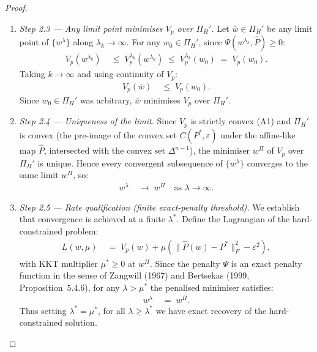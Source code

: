 \documentclass[12pt,openany]{book}
\newcommand{\bfw}{\mathbf{w}}
\newcommand{\calC}{\mathcal{C}}
\numberwithin{equation}{chapter}
\theoremstyle{plain}
\theoremstyle{definition}
\theoremstyle{remark}
\def\mathcal#1{#1}%
\def\calC{C}%
\def\bfw{w}%
\begin{document}
\begin{proof}
\begin{enumerate}
  \item \emph{Step 2.3 — Any limit point minimises $V_p$ over
        $\Pi_H'$.}
        Let $\bar\bfw \in \Pi_H'$ be any limit point of
        $\{\bfw^\lambda\}$ along $\lambda_k \to \infty$.
        For any $\bfw_0 \in \Pi_H'$, since
        $\Psi(\bfw^{\lambda_k},\hat{P}) \geq 0$:
        \begin{align}
          V_p(\bfw^{\lambda_k})
          &\;\leq\; V_p^{\lambda_k}(\bfw^{\lambda_k})
          \;\leq\; V_p^{\lambda_k}(\bfw_0)
          \;=\; V_p(\bfw_0).
          \label{eq:vp-ub-chain}
        \end{align}
        Taking $k \to \infty$ and using continuity of $V_p$:
        \begin{align}
          V_p(\bar\bfw) &\;\leq\; V_p(\bfw_0).
          \label{eq:vp-bar-opt}
        \end{align}
        Since $\bfw_0 \in \Pi_H'$ was arbitrary,
        $\bar\bfw$ minimises $V_p$ over $\Pi_H'$.

  \item \emph{Step 2.4 — Uniqueness of the limit.}
        Since $V_p$ is strictly convex (A1) and $\Pi_H'$ is convex
        (the pre-image of the convex set $\calC(P^*,\varepsilon)$
        under the affine-like map $\hat{P}$, intersected with the
        convex set $\Delta^{n-1}$), the minimiser $\bfw^{\Pi}$ of
        $V_p$ over $\Pi_H'$ is unique.  Hence every convergent
        subsequence of $\{\bfw^\lambda\}$ converges to the same
        limit $\bfw^{\Pi}$, so:
        \begin{align}
          \bfw^\lambda &\;\to\; \bfw^{\Pi}
          \quad \text{as } \lambda \to \infty.
          \label{eq:convergence}
        \end{align}

  \item \emph{Step 2.5 — Rate qualification (finite exact-penalty
        threshold).}
        We establish that convergence is achieved at a finite
        $\lambda^*$.  Define the Lagrangian of the hard-constrained
        problem:
        \begin{align}
          \mathcal{L}(\bfw, \mu)
          &\;=\; V_p(\bfw)
            + \mu\!\left(
              \|\hat{P}(\bfw) - P^*\|_F^2 - \varepsilon^2
            \right),
          \label{eq:lagrangian-soft}
        \end{align}
        with KKT multiplier $\mu^* \geq 0$ at $\bfw^{\Pi}$.  Since
        the penalty $\Psi$ is an exact penalty function in the sense
        of Zangwill (1967) and Bertsekas (1999, Proposition~5.4.6),
        for any $\lambda > \mu^*$ the penalised minimiser satisfies:
        \begin{align}
          \bfw^\lambda &\;=\; \bfw^{\Pi}.
          \label{eq:finite-exact}
        \end{align}
        Thus setting $\lambda^* = \mu^*$, for all
        $\lambda \geq \lambda^*$ we have exact recovery of the
        hard-constrained solution.
\end{enumerate}


\end{proof}
\end{document}
